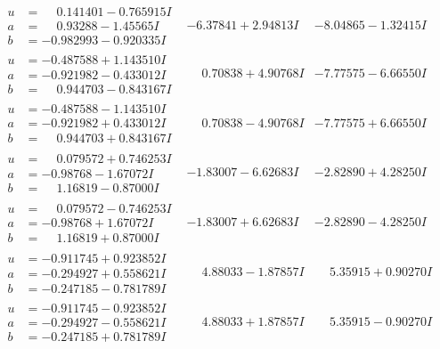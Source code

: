 \documentclass[1p]{elsarticle_modified}
\theoremstyle{definition}
\begin{document}
$$\begin{array}{c|c|c}
\begin{aligned}
u &= \phantom{-}0.141401 - 0.765915 I \\
a &= \phantom{-}0.93288 - 1.45565 I \\
b &= -0.982993 - 0.920335 I\end{aligned}
 & -6.37841 + 2.94813 I & -8.04865 - 1.32415 I \\ \hline\begin{aligned}
u &= -0.487588 + 1.143510 I \\
a &= -0.921982 - 0.433012 I \\
b &= \phantom{-}0.944703 - 0.843167 I\end{aligned}
 & \phantom{-}0.70838 + 4.90768 I & -7.77575 - 6.66550 I \\ \hline\begin{aligned}
u &= -0.487588 - 1.143510 I \\
a &= -0.921982 + 0.433012 I \\
b &= \phantom{-}0.944703 + 0.843167 I\end{aligned}
 & \phantom{-}0.70838 - 4.90768 I & -7.77575 + 6.66550 I \\ \hline\begin{aligned}
u &= \phantom{-}0.079572 + 0.746253 I \\
a &= -0.98768 - 1.67072 I \\
b &= \phantom{-}1.16819 - 0.87000 I\end{aligned}
 & -1.83007 - 6.62683 I & -2.82890 + 4.28250 I \\ \hline\begin{aligned}
u &= \phantom{-}0.079572 - 0.746253 I \\
a &= -0.98768 + 1.67072 I \\
b &= \phantom{-}1.16819 + 0.87000 I\end{aligned}
 & -1.83007 + 6.62683 I & -2.82890 - 4.28250 I \\ \hline\begin{aligned}
u &= -0.911745 + 0.923852 I \\
a &= -0.294927 + 0.558621 I \\
b &= -0.247185 - 0.781789 I\end{aligned}
 & \phantom{-}4.88033 - 1.87857 I & \phantom{-}5.35915 + 0.90270 I \\ \hline\begin{aligned}
u &= -0.911745 - 0.923852 I \\
a &= -0.294927 - 0.558621 I \\
b &= -0.247185 + 0.781789 I\end{aligned}
 & \phantom{-}4.88033 + 1.87857 I & \phantom{-}5.35915 - 0.90270 I \\ \hline\begin{aligned}

\end{aligned}
\end{array}$$
\end{document}
